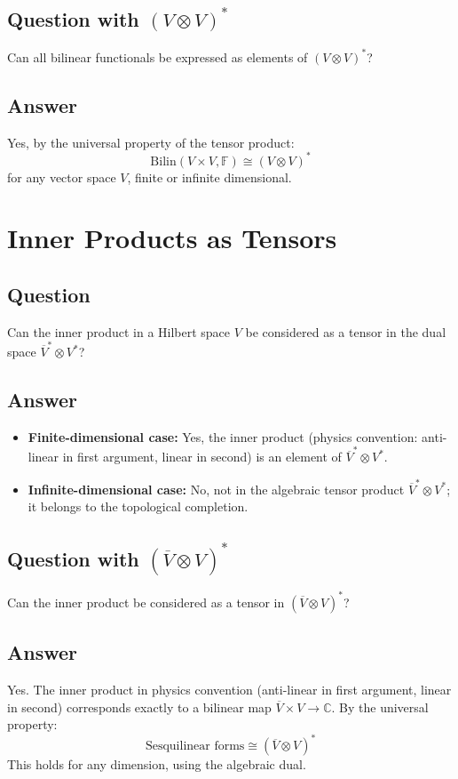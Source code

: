 \documentclass[aps,prl,reprint]{revtex4-2}
\begin{document}
\subsection{Question with $(V \otimes V)^*$}
Can all bilinear functionals be expressed as elements of $(V \otimes V)^*$?

\subsection{Answer}
Yes, by the universal property of the tensor product:
\[
\text{Bilin}(V \times V, \mathbb{F}) \cong (V \otimes V)^*
\]
for any vector space $V$, finite or infinite dimensional.

\section{Inner Products as Tensors}

\subsection{Question}
Can the inner product in a Hilbert space $V$ be considered as a tensor in the dual space $\overline{V}^* \otimes V^*$?

\subsection{Answer}
\begin{itemize}
\item \textbf{Finite-dimensional case:} Yes, the inner product (physics convention: anti-linear in first argument, linear in second) is an element of $\overline{V}^* \otimes V^*$.

\item \textbf{Infinite-dimensional case:} No, not in the algebraic tensor product $\overline{V}^* \otimes V^*$; it belongs to the topological completion.
\end{itemize}

\subsection{Question with $(\overline{V} \otimes V)^*$}
Can the inner product be considered as a tensor in $(\overline{V} \otimes V)^*$?

\subsection{Answer}
Yes. The inner product in physics convention (anti-linear in first argument, linear in second) corresponds exactly to a bilinear map $\overline{V} \times V \to \mathbb{C}$. By the universal property:
\[
\text{Sesquilinear forms} \cong (\overline{V} \otimes V)^*
\]
This holds for any dimension, using the algebraic dual.
\end{document}
